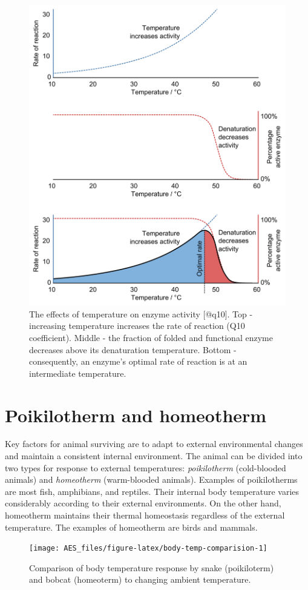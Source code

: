 \documentclass[]{book}
\begin{document}
\begin{figure}

{\centering \includegraphics[width=0.6\linewidth]{figures/q10} 

}

\caption{The effects of temperature on enzyme activity [@q10]. Top - increasing temperature increases the rate of reaction (Q10 coefficient). Middle - the fraction of folded and functional enzyme decreases above its denaturation temperature. Bottom - consequently, an enzyme's optimal rate of reaction is at an intermediate temperature.}\label{fig:q10}
\end{figure}

\section{Poikilotherm and homeotherm}\label{poikilotherm-and-homeotherm}

Key factors for animal surviving are to adapt to external environmental
changes and maintain a consistent internal environment. The animal can
be divided into two types for response to external temperatures:
\emph{poikilotherm} (cold-blooded animals) and \emph{homeotherm}
(warm-blooded animals). Examples of poikilotherms are most fish,
amphibians, and reptiles. Their internal body temperature varies
considerably according to their external environments. On the other
hand, homeotherm maintains their thermal homeostasis regardless of the
external temperature. The examples of homeotherm are birds and mammals.

\begin{figure}

{\centering \texttt{[image: AES\_files/figure-latex/body-temp-comparision-1]} 

}

\caption{Comparison of body temperature response by snake (poikiloterm) and bobcat (homeoterm) to changing ambient temperature.}\label{fig:body-temp-comparision}
\end{figure}
\end{document}
